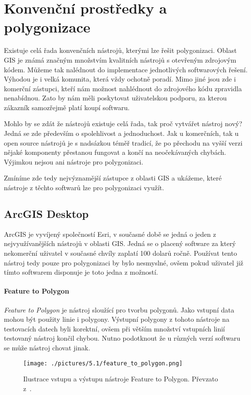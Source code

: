 \chapter{Konvenční prostředky a polygonizace}
\label{chap:konvencni prostredky a polygonizace}
	Existuje celá řada konvenčních nástrojů, kterými lze řešit polygonizaci. Oblast GIS je známá značným množstvím kvalitních nástrojů s otevřeným zdrojovým kódem. Můžeme tak nalédnout do implementace jednotlivých softwarových řešení. Výhodou je i velká komunita, která vždy ochotně poradí. Mimo jiné jsou zde i komerční zástupci, kteří nám možnost nahlédnout do zdrojového kódu zpravidla nenabídnou. Zato by nám měli poskytovat uživatelskou podporu, za kterou zákazník samozřejmě platí koupí softwaru.
	
	Mohlo by se zdát že nástrojů existuje celá řada, tak proč vytvářet nástroj nový? Jedná se zde především o spolehlivost a jednoduchost. Jak u komerčních, tak u open source nástrojů je s nadsázkou téměř tradicí, že po přechodu na vyšší verzi nějaké komponenty přestanou fungovat a končí na neočekávaných chybách. Výjimkou nejsou ani nástroje pro polygonizaci.
	
	Zmíníme zde tedy nejvýznamější zástupce z oblasti GIS a ukážeme, které nástroje z těchto softwarů lze pro polygonizaci využít.
	
\section{ArcGIS Desktop}
	ArcGIS je vyvíjený společností Esri, v současné době se jedná o jeden z nejvyužívanějších nástrojů v oblasti GIS. Jedná se o placený software za který nekomerční uživatel v současné chvíly zaplatí 100 dolarů ročně. Používat tento nástroj tedy pouze pro polygonizaci by bylo nesmyslné, ovšem pokud uživatel již tímto softwarem disponuje je toto jedna z možností.
	
\subsubsection{Feature to Polygon}
	\textit{Feature to Polygon} je nástroj sloužící pro tvorbu polygonů. Jako vstupní data mohou být použity linie i polygony. Výstupní polygony z tohoto nástroje na testovacích datech byli korektní, ovšem při větším množství vstupních linií testovaný nástroj končil chybou. Nutno podotknout že u různých verzí softwaru se může nástroj chovat jinak.

\begin{figure}[h]
  \centering
  \texttt{[image: ./pictures/5.1/feature\_to\_polygon.png]}
  \caption{Ilustrace vstupu a výstupu nástroje Feature to Polygon. Převzato z~\cite{arcgis}.}
  \label{fig:feature_to_polygon}
\end{figure}

